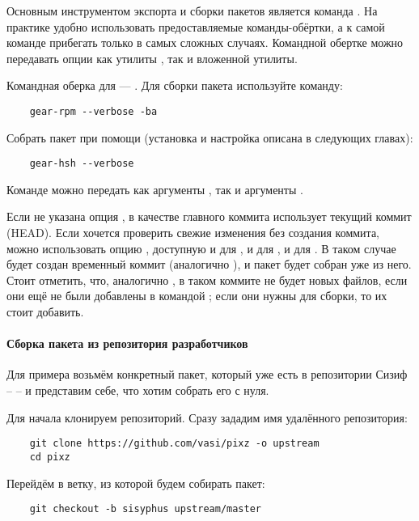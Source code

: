 Основным инструментом экспорта и сборки пакетов является команда . На практике удобно использовать предоставляемые команды-обёртки, а к самой команде  прибегать только в самых сложных случаях. Командной обертке можно передавать опции как утилиты , так и вложенной утилиты.

Командная оберка  для  --- . Для сборки пакета используйте команду: 
\begin{verbatim}
	gear-rpm --verbose -ba
\end{verbatim}


Собрать пакет при помощи  (установка и настройка  описана в следующих главах): 
\begin{verbatim}
	gear-hsh --verbose
\end{verbatim}

Команде  можно передать как аргументы , так и аргументы .

Если не указана опция ,  в качестве главного коммита использует текущий коммит (HEAD). Если хочется проверить свежие изменения без создания коммита, можно использовать опцию , доступную и для , и для , и для . В таком случае будет создан временный коммит (аналогично ), и пакет будет собран уже из него. Стоит отметить, что, аналогично , в таком коммите не будет новых файлов, если они ещё не были добавлены в  командой ; если они нужны для сборки, то их стоит добавить. 

\paragraph{Сборка пакета из репозитория разработчиков}
Для примера возьмём конкретный пакет, который уже есть в репозитории Сизиф --  -- и представим себе, что хотим собрать его с нуля.

Для начала клонируем репозиторий. Сразу зададим имя удалённого репозитория: 
\begin{verbatim}
	git clone https://github.com/vasi/pixz -o upstream
	cd pixz
\end{verbatim}

Перейдём в ветку, из которой будем собирать пакет: 
\begin{verbatim}
	git checkout -b sisyphus upstream/master
\end{verbatim}

